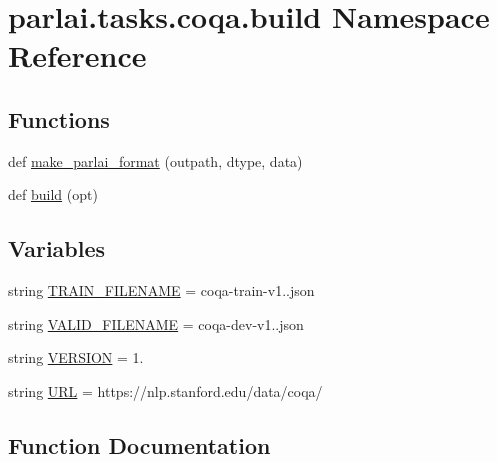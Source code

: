 \hypertarget{namespaceparlai_1_1tasks_1_1coqa_1_1build}{}\section{parlai.\+tasks.\+coqa.\+build Namespace Reference}
\label{namespaceparlai_1_1tasks_1_1coqa_1_1build}
\subsection*{Functions}
\begin{DoxyCompactItemize}
\item 
def \hyperlink{namespaceparlai_1_1tasks_1_1coqa_1_1build_ae2bc52f1ecab4681f1c2ebf013629aec}{make\+\_\+parlai\+\_\+format} (outpath, dtype, data)
\item 
def \hyperlink{namespaceparlai_1_1tasks_1_1coqa_1_1build_ae49969fbac6726d7510f9cefd4b8450a}{build} (opt)
\end{DoxyCompactItemize}
\subsection*{Variables}
\begin{DoxyCompactItemize}
\item 
string \hyperlink{namespaceparlai_1_1tasks_1_1coqa_1_1build_a9e8bb09b2205ec40d8d664394cfbbb5a}{T\+R\+A\+I\+N\+\_\+\+F\+I\+L\+E\+N\+A\+ME} = \textquotesingle{}coqa-\/train-\/v1..\+json\textquotesingle{}
\item 
string \hyperlink{namespaceparlai_1_1tasks_1_1coqa_1_1build_ac221827c661f66df3d1cd3aba9888d57}{V\+A\+L\+I\+D\+\_\+\+F\+I\+L\+E\+N\+A\+ME} = \textquotesingle{}coqa-\/dev-\/v1..\+json\textquotesingle{}
\item 
string \hyperlink{namespaceparlai_1_1tasks_1_1coqa_1_1build_acfdb0f28d99e915a52ffeaa441f932f4}{V\+E\+R\+S\+I\+ON} = \textquotesingle{}1.\textquotesingle{}
\item 
string \hyperlink{namespaceparlai_1_1tasks_1_1coqa_1_1build_adef1f0121b56206dff92bc3d0c20189d}{U\+RL} = \textquotesingle{}https\+://nlp.\+stanford.\+edu/data/coqa/\textquotesingle{}
\end{DoxyCompactItemize}


\subsection{Function Documentation}
\mbox{\label{namespaceparlai_1_1tasks_1_1coqa_1_1build_ae49969fbac6726d7510f9cefd4b8450a}} 
